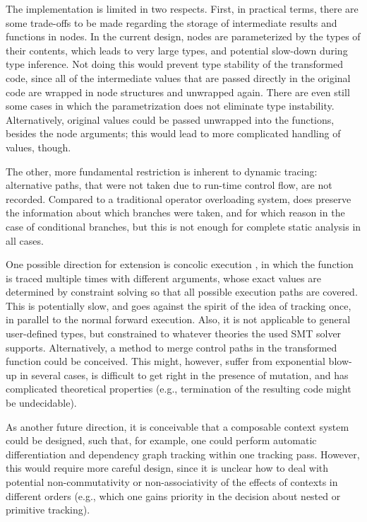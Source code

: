 
The implementation is limited in two respects.  First, in practical terms, there are some trade-offs
to be made regarding the storage of intermediate results and functions in nodes.  In the current
design, nodes are parameterized by the types of their contents, which leads to very large types, and
potential slow-down during type inference.  Not doing this would prevent type stability of the
transformed code, since all of the intermediate values that are passed directly in the original code
are wrapped in node structures and unwrapped again.  There are even still some cases in which the
parametrization does not eliminate type instability.  Alternatively, original values could be passed
unwrapped into the  functions, besides the node arguments; this would lead to
more complicated handling of values, though.

The other, more fundamental restriction is inherent to dynamic tracing: alternative paths, that were
not taken due to run-time control flow, are not recorded.  Compared to a traditional operator
overloading system, \irtrackerjl{} does preserve the information about which branches were taken,
and for which reason in the case of conditional branches, but this is not enough for complete static
analysis in all cases.

One possible direction for extension is concolic execution \parencite{zeller2019concolic}, in which
the function is traced multiple times with different arguments, whose exact values are determined by
constraint solving so that all possible execution paths are covered.  This is potentially slow, and
goes against the spirit of the idea of tracking once, in parallel to the normal forward execution.
Also, it is not applicable to general user-defined types, but constrained to whatever theories the
used SMT solver supports.  Alternatively, a method to merge control paths in the transformed
function could be conceived.  This might, however, suffer from exponential blow-up in several cases,
is difficult to get right in the presence of mutation, and has complicated theoretical properties
(e.g., termination of the resulting code might be undecidable).

As another future direction, it is conceivable that a composable context system could be designed,
such that, for example, one could perform automatic differentiation and dependency graph tracking
within one tracking pass.  However, this would require more careful design, since it is unclear how
to deal with potential non-commutativity or non-associativity of the effects of contexts in
different orders (e.g., which one gains priority in the decision about nested or primitive
tracking).


